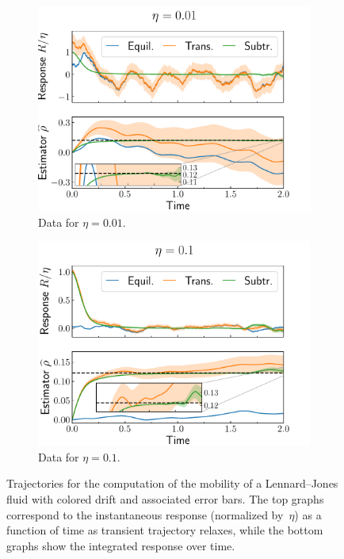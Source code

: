 \begin{figure}[h!]
\centering
\begin{subfigure}{0.49\textwidth}
    \includegraphics[width=\textwidth]{LJ_mobility_0.01.pdf}
    \caption{Data for $\eta = 0.01$.}
    \label{subfig:mobility_0.01}
\end{subfigure}
\hfill
\begin{subfigure}{0.49\textwidth}
    \includegraphics[width=\textwidth]{LJ_mobility_0.1.pdf}
    \caption{Data for $\eta = 0.1$.}
    \label{subfig:mobility_0.1}
\end{subfigure}
\caption{Trajectories for the computation of the mobility of a Lennard--Jones fluid with colored drift and associated error bars. The top graphs correspond to the instantaneous response (normalized by~$\eta$) as a function of time as transient trajectory relaxes, while the bottom graphs show the integrated response over time.}
\label{fig:LJ_mobility}
\end{figure}
